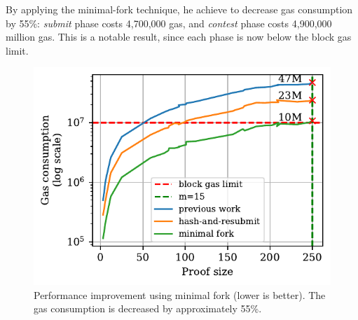 By applying the minimal-fork technique, he achieve to decrease gas consumption
by 55\%: \emph{submit} phase costs {4{,}700{,}000} gas, and \emph{contest}
phase costs {4{,}900{,}000} million gas. This is a notable result, since each
phase is now below the block gas limit.



\begin{figure}[h]
    \begin{center}
        \includegraphics[width=1\columnwidth]{figures/minimal-fork.pdf}
    \end{center}
    \caption{Performance improvement using minimal fork (lower is better). The
        gas consumption is decreased by approximately 55\%.}
    \label{fig:minimal-fork}
\end{figure}

